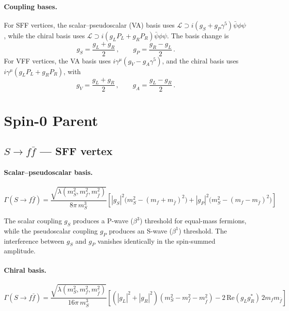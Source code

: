 \documentclass[11pt,a4paper]{article}
\newcommand{\la}{\lambda}
\newcommand{\beq}{\begin{equation}}
\newcommand{\eeq}{\end{equation}}
\newcommand{\conj}[1]{#1^{*}}
\begin{document}
\paragraph{Coupling bases.} For SFF vertices, the scalar--pseudoscalar (VA) basis uses
$\mathcal{L} \supset i(g_S + g_P\gamma^5)\bar{\psi}\phi\psi$, while the chiral basis uses
$\mathcal{L} \supset i(g_L P_L + g_R P_R)\bar{\psi}\phi\psi$. The basis change is
\beq
g_S = \frac{g_L + g_R}{2}\,,\qquad g_P = \frac{g_R - g_L}{2}\,.
\label{eq:sff-basis}
\eeq
For VFF vertices, the VA basis uses $i\gamma^\mu(g_V - g_A\gamma^5)$, and the chiral basis
uses $i\gamma^\mu(g_L P_L + g_R P_R)$, with
\beq
g_V = \frac{g_L + g_R}{2}\,,\qquad g_A = \frac{g_L - g_R}{2}\,.
\label{eq:vff-basis}
\eeq

\section{Spin-0 Parent}
\label{sec:spin0}

\subsection{$S \to f\bar{f}$ --- SFF vertex}
\label{sec:S-ff}

\paragraph{Scalar--pseudoscalar basis.}
\beq
\boxed{
\Gamma(S\to f\bar{f}) = \frac{\sqrt{\la(m_S^2, m_f^2, m_{\bar f}^2)}}{8\pi\, m_S^3}
\left[|g_S|^2\bigl(m_S^2 - (m_f+m_{\bar f})^2\bigr)
+ |g_P|^2\bigl(m_S^2 - (m_f-m_{\bar f})^2\bigr)\right]
}
\label{eq:S-ff-va}
\eeq

The scalar coupling $g_S$ produces a P-wave ($\beta^3$) threshold for equal-mass fermions,
while the pseudoscalar coupling $g_P$ produces an S-wave ($\beta^1$) threshold.
The interference between $g_S$ and $g_P$ vanishes identically in the spin-summed amplitude.

\paragraph{Chiral basis.}
\beq
\Gamma(S\to f\bar{f}) = \frac{\sqrt{\la(m_S^2, m_f^2, m_{\bar f}^2)}}{16\pi\, m_S^3}
\left[(|g_L|^2+|g_R|^2)(m_S^2-m_f^2-m_{\bar f}^2)
- 2\,\mathrm{Re}(g_L\conj{g_R})\,2m_f m_{\bar f}\right]
\label{eq:S-ff-ch}
\eeq
\end{document}
